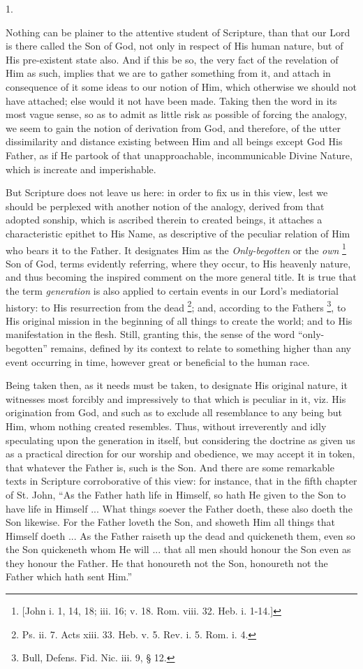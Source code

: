 1.

Nothing can be plainer to the attentive student of Scripture, than
that our Lord is there called the Son of God, not only in respect of
His human nature, but of His pre-existent state also. And if this be
so, the very fact of the revelation of Him as such, implies that we
are to gather something from it, and attach in consequence of it some
ideas to our notion of Him, which otherwise we should not have
attached; else would it not have been made. Taking then the word in
its most vague sense, so as to admit as little risk as possible of
forcing the analogy, we seem to gain the notion of derivation from
God, and therefore, of the utter dissimilarity and distance existing
between Him and all beings except God His Father, as if He partook of
that unapproachable, incommunicable Divine Nature, which is increate
and imperishable.

But Scripture does not leave us here: in order to fix us in this
view, lest we should be perplexed with another notion of the analogy,
derived from that adopted sonship, which is ascribed therein to
created beings, it attaches a characteristic epithet to His Name, as
descriptive of the peculiar relation of Him who bears it to the
Father. It designates Him as the \emph{Only-begotten} or the \emph{own}
\footnote{[John i. 1, 14, 18; iii. 16; v. 18. Rom.
viii. 32. Heb. i. 1-14.]} Son of God, terms
evidently referring, where they occur, to His heavenly nature, and
thus becoming the inspired comment on the more general title. It is
true that the term \emph{generation} is also applied to certain events
in our Lord's mediatorial history: to His resurrection from the dead \footnote{Ps. ii. 7. Acts xiii. 33. Heb. v. 5. Rev. i.
5. Rom. i. 4.}; and, according to the Fathers \footnote{Bull, Defens. Fid. Nic. iii. 9, § 12.}, to His original mission in the beginning of all things to
create the world; and to His manifestation in the flesh. Still,
granting this, the sense of the word ``only-begotten''
remains, defined by its context to relate to something higher than any
event occurring in time, however great or beneficial to the human
race.

Being taken then, as it needs must be taken, to designate His
original nature, it witnesses most forcibly and impressively to that
which is peculiar in it, viz. His origination from God, and such as to
exclude all resemblance to any being but Him, whom nothing created
resembles. Thus, without irreverently and idly speculating upon the
generation in itself, but considering the doctrine as given us as a
practical direction for our worship and obedience, we may accept it in
token, that whatever the Father is, such is the Son. And there are
some remarkable texts in Scripture corroborative of this view: for
instance, that in the fifth chapter of St. John, ``As the Father
hath life in Himself, so hath He given to the Son to have life in
Himself ... What things soever the Father doeth, these also doeth the
Son likewise. For the Father loveth the Son, and showeth Him all
things that Himself doeth ... As the Father raiseth up the dead and
quickeneth them, even so the Son quickeneth whom He will ... that all
men should honour the Son even as they honour the Father. He that
honoureth not the Son, honoureth not the Father which hath sent
Him.''

